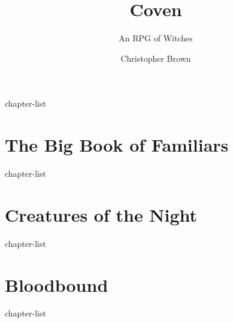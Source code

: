 \documentclass[a4paper,10pt,twocolumn]{memoir}
\title{Coven}
\subtitle{An RPG of Witches}
\author{Christopher Brown}
\begin{document}
\frontmatter

\titlepage



\tableofcontents

\mainmatter

{chapter-list}

\part{The Big Book of Familiars}
{chapter-list}

\part{Creatures of the Night}
{chapter-list}

\part{Bloodbound}
{chapter-list}

\backmatter

\printindex
\end{document}
